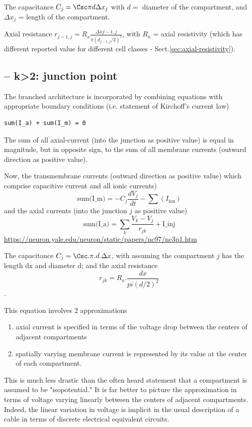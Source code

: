 The capacitance $C_j = \Csc \pi d \Delta x_j$ with $d=$ diameter of the
compartment, and $\Delta x_j$ = length of the compartment.

Axial resistance $r_{j-1,j} = R_a \frac{\Delta x{j-1,j}}{\pi (d_{j-1,j}/2)^2}$,
with $R_a$ = axial resistivity (which has different reported value for
different cell classes - Sect.\ref{sec:axial-resistivity}).

\subsection{-- k>2: junction point}


The branched architecture is incorporated by combining equations with
appropriate boundary conditions (i.e. statement of Kirchoff's current law)
\begin{verbatim}
sum(I_a) + sum(I_m) = 0
\end{verbatim}
The sum of all axial-current (into the junction as positive value) is equal in
magnitude, but in opposite sign, to the sum of all membrane currents (outward direction as
positive value).

Now, the transmembrane currents (outward direction as positive value) which
comprise capacitive current and all ionic currents)
\begin{equation}
\text{sum(I\_m)} = - C_j \frac{dV_j}{dt} - \sum( I_{\text{ion}})
\end{equation}
and the axial currents (into the junction $j$ as positive value)
\begin{equation}
\text{sum(I\_a)} = \sum_k \frac{V_k - V_j}{r_{jk}} + \text{I\_inj} 
\end{equation}
\url{https://neuron.yale.edu/neuron/static/papers/nc97/nc3p1.htm}

The capacitance $C_j = \Csc . \pi . d . \Delta x$, with assuming
the compartment $j$ has the length  dx and diameter d; and the axial resistance
\begin{equation*}
r_{jk} = R_a . \frac{dx}{pi (d/2)^2}
\end{equation*}.


This equation involves 2 approximations
\begin{enumerate}
  \item  axial current is specified in terms of the voltage drop between the
  centers of adjacent compartments 
  
  \item  spatially varying membrane current is represented by its value at the
  center of each compartment.
\end{enumerate}
This is much less drastic than the often heard statement that a compartment is
assumed to be "isopotential." It is far better to picture the approximation in
terms of voltage varying linearly between the centers of adjacent compartments.
Indeed, the linear variation in voltage is implicit in the usual description of
a cable in terms of discrete electrical equivalent circuits.

